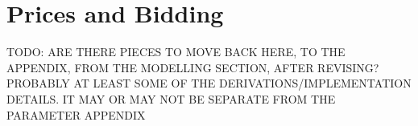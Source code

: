\chapter[Bidding]{Prices and Bidding}
\label{appendix-bid-price}

TODO: ARE THERE PIECES TO MOVE BACK HERE, TO THE APPENDIX, FROM THE MODELLING SECTION, AFTER REVISING? PROBABLY AT LEAST SOME OF THE DERIVATIONS/IMPLEMENTATION DETAILS. IT MAY OR MAY NOT BE SEPARATE FROM THE PARAMETER APPENDIX
